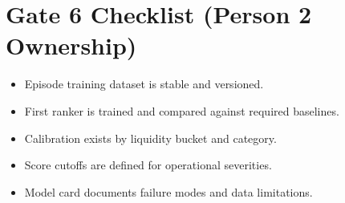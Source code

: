 \documentclass{article}
\begin{document}
\section*{Gate 6 Checklist (Person 2 Ownership)}
\begin{itemize}
\item Episode training dataset is stable and versioned.
\item First ranker is trained and compared against required baselines.
\item Calibration exists by liquidity bucket and category.
\item Score cutoffs are defined for operational severities.
\item Model card documents failure modes and data limitations.
\end{itemize}
\end{document}

